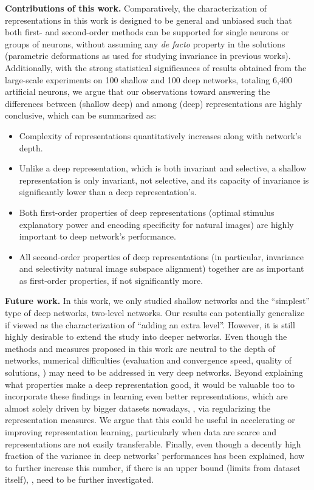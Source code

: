 \documentclass[10pt,twocolumn,letterpaper]{article}
\begin{document}
{\bf Contributions of this work.} Comparatively, the characterization of representations in this work is designed to be general and unbiased such that both first- and second-order methods can be supported for single neurons or groups of neurons, without assuming any \emph{de facto} property in the solutions (\eg parametric deformations as used for studying invariance in previous works).
Additionally, with the strong statistical significances of results obtained from the large-scale experiments on 100 shallow and 100 deep networks, totaling 6,400 artificial neurons, we argue that our observations toward answering the differences between (shallow \vs deep) and among (deep) representations are highly conclusive, which can be summarized as:
\begin{itemize} %
\setlength\itemsep{0.0ex}
\item Complexity of representations quantitatively increases along with network's depth.
\item Unlike a deep representation, which is both invariant and selective, a shallow representation is only invariant, not selective, and its capacity of invariance is significantly lower than a deep representation's.
\item Both first-order properties of deep representations (optimal stimulus explanatory power and encoding specificity for natural images) are highly important to deep network's performance.
\item All second-order properties of deep representations (in particular, invariance and selectivity \vs natural image subspace alignment) together are as important as first-order properties, if not significantly more.
\end{itemize}

{\bf Future work.} In this work, we only studied shallow networks and the ``simplest'' type of deep networks, two-level networks.
Our results can potentially generalize if viewed as the characterization of ``adding an extra level''.
However, it is still highly desirable to extend the study into deeper networks.
Even though the methods and measures proposed in this work are neutral to the depth of networks, numerical difficulties (\eg evaluation and convergence speed, quality of solutions, \etc) may need to be addressed in very deep networks.
Beyond explaining what properties make a deep representation good, it would be valuable too to incorporate these findings in learning even better representations, which are almost solely driven by bigger datasets nowadays, \eg, via regularizing the representation measures.  
We argue that this could be useful in accelerating or improving representation learning, particularly when data are scarce and representations are not easily transferable.
Finally, even though a decently high fraction of the variance in deep networks' performances has been explained, how to further increase this number, if there is an upper bound (\eg limits from dataset itself), \etc, need to be further investigated.
\end{document}
